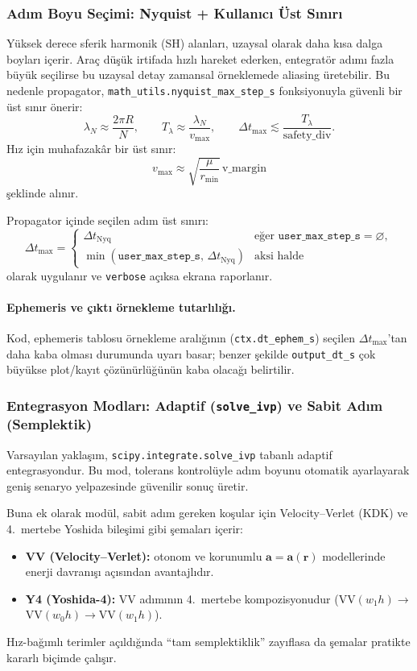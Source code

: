\subsubsection*{Adım Boyu Seçimi: Nyquist + Kullanıcı Üst Sınırı}
Yüksek derece sferik harmonik (SH) alanları, uzaysal olarak daha kısa dalga boyları içerir.
Araç düşük irtifada hızlı hareket ederken, entegratör adımı fazla büyük seçilirse
bu uzaysal detay zamansal örneklemede aliasing üretebilir.
Bu nedenle propagator, \texttt{math\_utils.nyquist\_max\_step\_s} fonksiyonuyla güvenli bir üst sınır önerir:
\[
\lambda_N \approx \frac{2\pi R}{N},\qquad
T_\lambda \approx \frac{\lambda_N}{v_{\max}},\qquad
\Delta t_{\max} \lesssim \frac{T_\lambda}{\text{safety\_div}}.
\]
Hız için muhafazakâr bir üst sınır:
\[
v_{\max} \approx \sqrt{\frac{\mu}{r_{\min}}}\,\text{v\_margin}
\]
şeklinde alınır.

Propagator içinde seçilen adım üst sınırı:
\[
\Delta t_{\max}=\begin{cases}
\Delta t_{\text{Nyq}} & \text{eğer } \texttt{user\_max\_step\_s}=\varnothing,\\
\min(\texttt{user\_max\_step\_s},\,\Delta t_{\text{Nyq}}) & \text{aksi halde}
\end{cases}
\]
olarak uygulanır ve \texttt{verbose} açıksa ekrana raporlanır.

\paragraph{Ephemeris ve çıktı örnekleme tutarlılığı.}
Kod, ephemeris tablosu örnekleme aralığının (\texttt{ctx.dt\_ephem\_s})
seçilen \(\Delta t_{\max}\)’tan daha kaba olması durumunda uyarı basar;
benzer şekilde \texttt{output\_dt\_s} çok büyükse plot/kayıt çözünürlüğünün kaba olacağı belirtilir.

\subsubsection*{Entegrasyon Modları: Adaptif (\texttt{solve\_ivp}) ve Sabit Adım (Semplektik)}
Varsayılan yaklaşım, \texttt{scipy.integrate.solve\_ivp} tabanlı adaptif entegrasyondur.
Bu mod, tolerans kontrolüyle adım boyunu otomatik ayarlayarak geniş senaryo yelpazesinde güvenilir sonuç üretir.

Buna ek olarak modül, sabit adım gereken koşular için
Velocity--Verlet (KDK) ve 4.\ mertebe Yoshida bileşimi gibi şemaları içerir:
\begin{itemize}
\item \textbf{VV (Velocity--Verlet):} otonom ve korunumlu \( \mathbf a=\mathbf a(\mathbf r) \) modellerinde enerji davranışı açısından avantajlıdır.
\item \textbf{Y4 (Yoshida-4):} VV adımının 4.\ mertebe kompozisyonudur (VV\((w_1 h)\)\(\rightarrow\)VV\((w_0 h)\)\(\rightarrow\)VV\((w_1 h)\)). 
\end{itemize}
Hız-bağımlı terimler açıldığında ``tam semplektiklik'' zayıflasa da şemalar pratikte kararlı biçimde çalışır.

